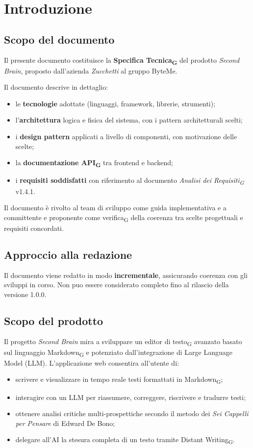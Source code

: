 \documentclass[11pt,a4paper]{article}
\newcommand{\gls}[1]{#1\textsubscript{G}}
\begin{document}
\setcounter{page}{1}

\section{Introduzione}
\subsection{Scopo del documento}
Il presente documento costituisce la \textbf{\gls{Specifica Tecnica}} del prodotto
\textit{Second Brain}, proposto dall'azienda \textit{Zucchetti} al
gruppo ByteMe.
 
Il documento descrive in dettaglio:
\begin{itemize}
  \item le \textbf{tecnologie} adottate (linguaggi, framework, librerie, strumenti);
  \item l'\textbf{architettura} logica e fisica del sistema, con i pattern architetturali scelti;
  \item i \textbf{design pattern} applicati a livello di componenti, con motivazione delle scelte;
  \item la \textbf{documentazione \gls{API}} tra frontend e backend;
  \item i \textbf{requisiti soddisfatti} con riferimento al documento \textit{\gls{Analisi dei Requisiti}} v1.4.1.
\end{itemize}
 
Il documento è rivolto al team di sviluppo come guida implementativa e a
committente e proponente come \gls{verifica} della coerenza tra scelte progettuali e requisiti concordati.
 
\subsection{Approccio alla redazione}
Il documento viene redatto in modo \textbf{incrementale}, assicurando coerenza con gli sviluppi in corso. Non puo essere considerato completo fino al rilascio della versione 1.0.0.

\subsection{Scopo del prodotto}
Il progetto \textit{Second Brain} mira a sviluppare un \gls{editor di testo} avanzato basato sul linguaggio \gls{Markdown} e potenziato dall'integrazione di Large Language Model (LLM).
L'applicazione web consentira all'utente di:
\begin{itemize}
  \item scrivere e visualizzare in tempo reale testi formattati in \gls{Markdown};
  \item interagire con un LLM per riassumere, correggere, riscrivere e tradurre testi;
  \item ottenere analisi critiche multi-prospettiche secondo il metodo dei \textit{Sei Cappelli per Pensare} di Edward De Bono;
  \item delegare all'AI la stesura completa di un testo tramite \gls{Distant Writing}.
\end{itemize}
 
\end{document}
